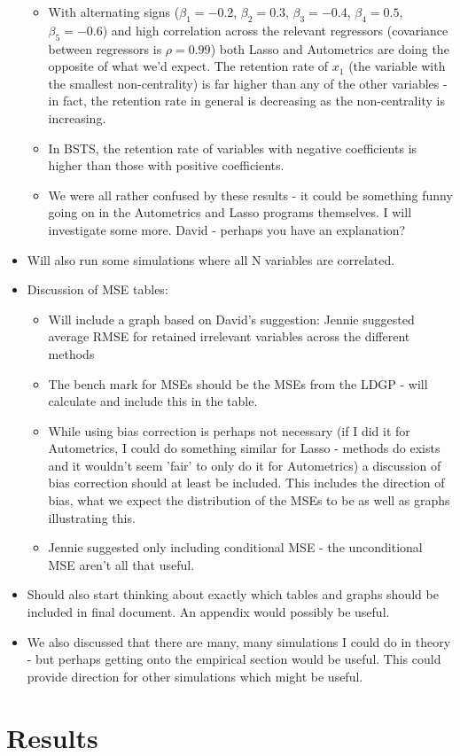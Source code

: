 \documentclass[11pt, oneside]{book}   	%
\begin{document}
\begin{itemize}
\begin{itemize}
\item With alternating signs ($\beta_{1}=-0.2$, $\beta_{2}=0.3$, $\beta_{3}=-0.4$, $\beta_{4}=0.5$, $\beta_{5}=-0.6$) and high correlation across the relevant regressors (covariance between regressors is $\rho=0.99$)  both Lasso and Autometrics are doing the opposite of what we'd expect. The retention rate of $x_{1}$ (the variable with the smallest non-centrality) is far higher than any of the other variables - in fact, the retention rate in general is decreasing as the non-centrality is increasing. 
\item In BSTS, the retention rate of variables with negative coefficients is higher than those with positive coefficients. 
\item We were all rather confused by these results - it could be something funny going on in the Autometrics and Lasso programs themselves. I will investigate some more. David - perhaps you have an explanation?
\end{itemize}
\item Will also run some simulations where all N variables are correlated.
\item Discussion of MSE tables:
\begin{itemize}
\item Will include a graph based on David's suggestion: Jennie suggested average RMSE for retained irrelevant variables across the different methods
\item The bench mark for MSEs should be the MSEs from the LDGP - will calculate and include this in the table.
\item While using bias correction is perhaps not necessary (if I did it for Autometrics, I could do something similar for Lasso - methods do exists and it wouldn't seem 'fair' to only do it for Autometrics) a discussion of bias correction should at least be included. This includes the direction of bias, what we expect the distribution of the MSEs to be as well as graphs illustrating this.  
\item Jennie suggested only including conditional MSE - the unconditional MSE aren't all that useful.
\end{itemize}
\item Should also start thinking about exactly which tables and graphs should be included in final document. An appendix would possibly be useful.
\item We also discussed that there are many, many simulations I could do in theory - but perhaps getting onto the empirical section would be useful. This could provide direction for other simulations which might be useful.  



\end {itemize}

\chapter{Results}
\end{document}
